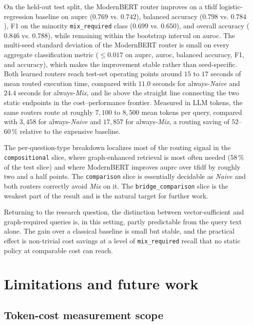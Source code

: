 \documentclass[english, bibtex]{kththesis}               %
\numberwithin{listing}{chapter}
\begin{document}
On the held-out test split, the ModernBERT router improves on a \gls{tfidf} logistic-regression baseline on \gls{auprc} ($0.769$ vs. $0.742$), balanced accuracy ($0.798$ vs. $0.784$), F1 on the minority \texttt{mix\_required} class ($0.699$ vs. $0.650$), and overall accuracy ($0.846$ vs. $0.788$), while remaining within the bootstrap interval on \gls{auroc}. The multi-seed standard deviation of the ModernBERT router is small on every aggregate classification metric ($\leq 0.017$ on \gls{auprc}, \gls{auroc}, balanced accuracy, F1, and accuracy), which makes the improvement stable rather than seed-specific. Both learned routers reach test-set operating points around $15$ to $17$ seconds of mean routed execution time, compared with $11.0$ seconds for always-\emph{Naive} and $24.4$ seconds for always-\emph{Mix}, and lie above the straight line connecting the two static endpoints in the cost--performance frontier. Measured in LLM tokens, the same routers route at roughly $7{,}100$ to $8{,}500$ mean tokens per query, compared with $3{,}458$ for always-\emph{Naive} and $17{,}857$ for always-\emph{Mix}, a routing saving of $52$--$60\,\%$ relative to the expensive baseline.

The per-question-type breakdown localizes most of the routing signal in the \texttt{compositional} slice, where graph-enhanced retrieval is most often needed ($58\,\%$ of the test slice) and where ModernBERT improves \gls{auprc} over \gls{tfidf} by roughly two and a half points. The \texttt{comparison} slice is essentially decidable as \emph{Naive} and both routers correctly avoid \emph{Mix} on it. The \texttt{bridge\_comparison} slice is the weakest part of the result and is the natural target for further work.

Returning to the research question, the distinction between vector-sufficient and graph-required queries is, in this setting, partly predictable from the query text alone. The gain over a classical baseline is small but stable, and the practical effect is non-trivial cost savings at a level of \texttt{mix\_required} recall that no static policy at comparable cost can reach.

\section{Limitations and future work}
\label{sec:limitationsFutureWork}

\subsection{Token-cost measurement scope}
\label{sec:limitTokenCost}
\end{document}
